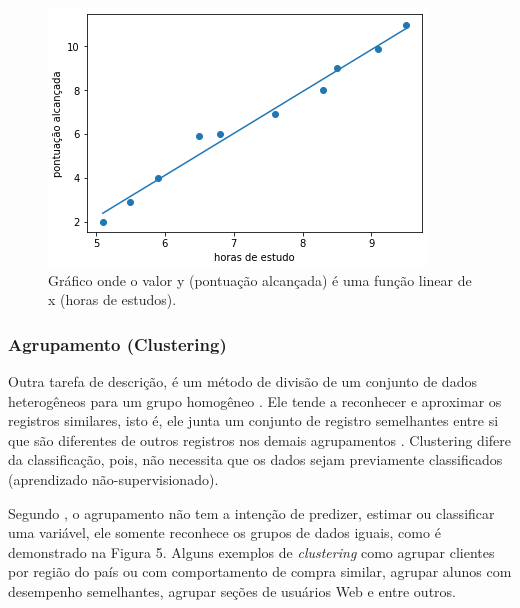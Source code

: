 \begin{figure}[!htp]
	\begin{center}
    \caption{\label{fig:waveform_fig} Gráfico onde o valor y (pontuação alcançada) é uma função linear de x (horas de estudos).}
	\includegraphics[scale=0.99]{Figuras/Regressao_linear.png}
	\end{center}
\end{figure}

\subsubsection{Agrupamento (Clustering)}

\par
Outra tarefa de descrição, é um método de divisão de um conjunto de dados heterogêneos para um grupo homogêneo \cite{LeandroSilva2014}. Ele tende a reconhecer e aproximar os registros similares, isto é, ele junta um conjunto de registro semelhantes entre si que são diferentes de outros registros nos demais agrupamentos \cite{Camilo2009}. Clustering difere da classificação, pois, não necessita que os dados sejam previamente classificados (aprendizado não-supervisionado).

\par
Segundo \cite{Camilo2009}, o agrupamento não tem a intenção de predizer, estimar ou classificar uma variável, ele somente reconhece os grupos de dados iguais, como é demonstrado na Figura 5. Alguns exemplos de \textit{clustering} como agrupar clientes por região do país ou com comportamento de compra similar, agrupar alunos com desempenho semelhantes, agrupar seções de usuários Web e entre outros.



